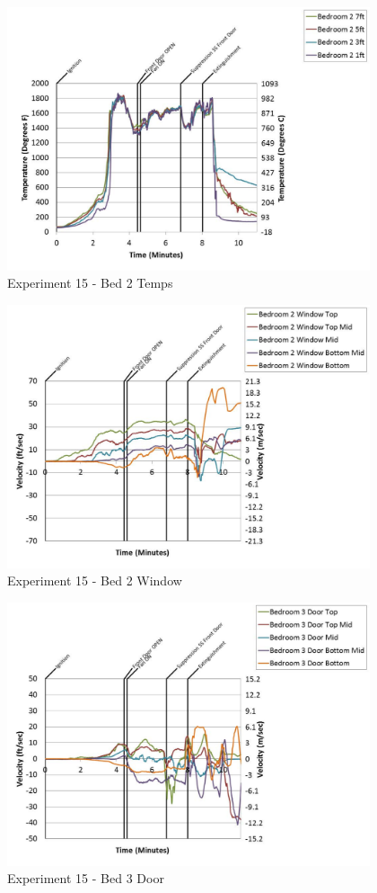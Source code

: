 \documentclass{article}
\begin{document}
\begin{appendices}
	\begin{figure}[h!]
		\centering
		\includegraphics[height=3.05in]{0_Images/Results_Charts/Exp_15_Charts/Bed2Temps.pdf}
		\caption{Experiment 15 - Bed 2 Temps}
	\end{figure}
 
	\clearpage

	\begin{figure}[h!]
		\centering
		\includegraphics[height=3.05in]{0_Images/Results_Charts/Exp_15_Charts/Bed2Window.pdf}
		\caption{Experiment 15 - Bed 2 Window}
	\end{figure}
 

	\begin{figure}[h!]
		\centering
		\includegraphics[height=3.05in]{0_Images/Results_Charts/Exp_15_Charts/Bed3Door.pdf}
		\caption{Experiment 15 - Bed 3 Door}
	\end{figure}
 

\end{appendices}
\end{document}

